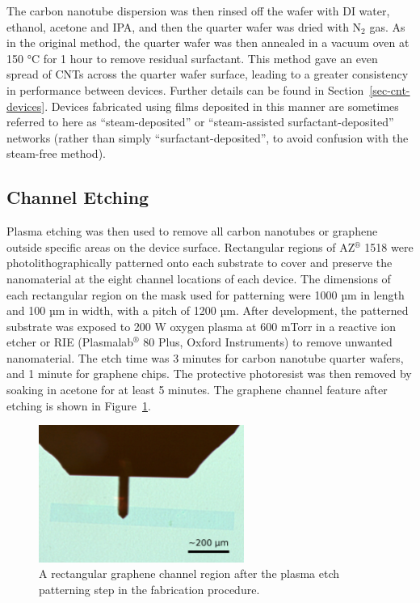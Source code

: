 \documentclass[
  a4paper,
]{scrbook}
\begin{document}
The carbon nanotube dispersion was then rinsed off the wafer with DI
water, ethanol, acetone and IPA, and then the quarter wafer was dried
with N\(_2\) gas. As in the original method, the quarter wafer was then
annealed in a vacuum oven at 150 °C for 1 hour to remove residual
surfactant. This method gave an even spread of CNTs across the quarter
wafer surface, leading to a greater consistency in performance between
devices. Further details can be found in Section~\ref{sec-cnt-devices}.
Devices fabricated using films deposited in this manner are sometimes
referred to here as ``steam-deposited'' or ``steam-assisted
surfactant-deposited'' networks (rather than simply
``surfactant-deposited'', to avoid confusion with the steam-free
method).

\hypertarget{channel-etching}{%
\subsection{Channel Etching}\label{channel-etching}}

Plasma etching was then used to remove all carbon nanotubes or graphene
outside specific areas on the device surface. Rectangular regions of
AZ\(^\circledR\) 1518 were photolithographically patterned onto each
substrate to cover and preserve the nanomaterial at the eight channel
locations of each device. The dimensions of each rectangular region on
the mask used for patterning were 1000 µm in length and 100 µm in width,
with a pitch of 1200 µm. After development, the patterned substrate was
exposed to 200 W oxygen plasma at 600 mTorr in a reactive ion etcher or
RIE (Plasmalab\(^\circledR\) 80 Plus, Oxford Instruments) to remove
unwanted nanomaterial. The etch time was 3 minutes for carbon nanotube
quarter wafers, and 1 minute for graphene chips. The protective
photoresist was then removed by soaking in acetone for at least 5
minutes. The graphene channel feature after etching is shown in
Figure~\ref{fig-microscope-graphene-channel}.

\begin{figure}

{\centering \includegraphics[width=0.6\textwidth,height=\textheight]{figures/ch4/modified_channel-area.png}

}

\caption[A rectangular graphene channel region after the plasma etch
patterning step in the fabrication
procedure.]{\label{fig-microscope-graphene-channel}A rectangular
graphene channel region after the plasma etch patterning step in the
fabrication procedure.}

\end{figure}
\end{document}
